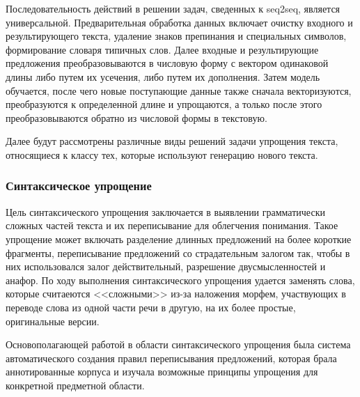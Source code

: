 Последовательность действий в решении задач, сведенных к seq2seq, является универсальной. Предварительная обработка данных включает очистку входного и результирующего текста, удаление знаков препинания и специальных символов, формирование словаря типичных слов. Далее входные и результирующие предложения преобразовываются в числовую форму с вектором одинаковой длины либо путем их усечения, либо путем их дополнения. Затем модель обучается, после чего новые поступающие данные также сначала векторизуются, преобразуются к определенной длине и упрощаются, а только после этого преобразовываются обратно из числовой формы в текстовую.

Далее будут рассмотрены различные виды решений задачи упрощения текста, относящиеся к классу тех, которые используют генерацию нового текста.

\subsubsection{Синтаксическое упрощение}

Цель синтаксического упрощения заключается в выявлении грамматически сложных частей текста и их переписывание для облегчения понимания. Такое упрощение может включать разделение длинных предложений на более короткие фрагменты, переписывание предложений со страдательным залогом так, чтобы в них использовался залог действительный\footnotemark{}, разрешение двусмысленностей и анафор\cite{shardlow_survey_2014}. По ходу выполнения синтаксического упрощения удается заменять слова, которые считаеются <<сложными>> из-за наложения морфем, участвующих в переводе слова из одной части речи в другую, на их более простые, оригинальные версии.


Основополагающей работой в области синтаксического упрощения была система автоматического создания правил переписывания предложений\cite{chandrasekar_automatic_1997}, которая брала аннотированные корпуса и изучала возможные принципы упрощения для конкретной предметной области.  

